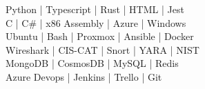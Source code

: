 
\vspace{.075in}


\smallskip
Python | Typescript | Rust | HTML | Jest \\ 
C | C\# | x86 Assembly | Azure | Windows \\
Ubuntu | Bash | Proxmox | Ansible | Docker \\ 
Wireshark | CIS-CAT | Snort | YARA | NIST \\
MongoDB | CosmosDB | MySQL | Redis  \\
Azure Devops | Jenkins | Trello | Git

